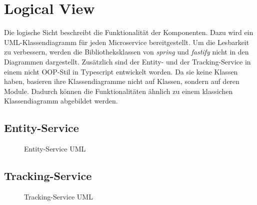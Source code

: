 \section{Logical View}
Die logische Sicht beschreibt die Funktionalität der Komponenten. Dazu wird ein UML-Klassendiagramm für jeden 
Microservice bereitgestellt. Um die Lesbarkeit zu verbessern, werden die Bibliotheksklassen von \textit{spring} und \textit{fastify} nicht in den Diagrammen dargestellt.
Zusätzlich sind der Entity- und der Tracking-Service in einem nicht OOP-Stil in Typescript entwickelt worden. Da sie keine Klassen haben, basieren ihre Klassendiagramme nicht auf Klassen, sondern auf deren Module. Dadurch können die Funktionalitäten ähnlich zu einem klassichen Klassendiagramm abgebildet werden.

\subsection{Entity-Service}
\begin{figure}[!ht]
    \centering
    \caption{Entity-Service UML}
    \label{fig:entity-service}
\end{figure}
\subsection{Tracking-Service}
\begin{figure}[!ht]
    \centering
    \caption{Tracking-Service UML}
    \label{fig:tracking-service}
\end{figure}
